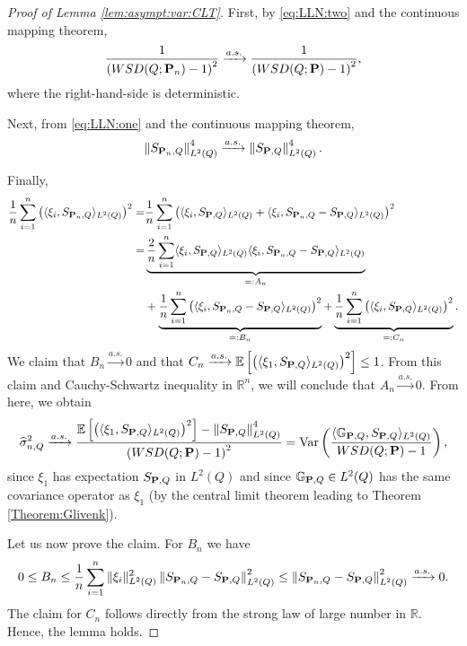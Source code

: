 \documentclass{imsart}
\numberwithin{equation}{section}
\def\R{\mathbb{R}}
\def\E{\mathbb{E}}
\def\E{\mathbb E}
\def\Var{\operatorname{Var}}
\begin{document}
\begin{proof}[Proof of Lemma \ref{lem:asympt:var:CLT}]
	First, by \eqref{eq:LLN:two} and the continuous mapping theorem,
	\[
	\frac{1}{
		\left(
		\rm WSD(Q; {\bf P}_n ) - 1
		\right)^2 
	}
	\xrightarrow{a.s.}
	\frac{1}{
		\left(
		\rm WSD(Q; {\bf P} ) - 1
		\right)^2},
	\]
	where the right-hand-side is deterministic.
	
	Next,  from \eqref{eq:LLN:one} and the continuous mapping theorem,
	\[
	\left\| 
	S_{{\bf P}_n,Q }
	\right\|_{L^2(Q)}^4
	\xrightarrow{a.s.}
	\left\| 
	S_{{\bf P},Q }
	\right\|_{L^2(Q)}^4.
	\]
	
	Finally,
	\begin{align*}
		\frac{1}{n}\sum_{i=1}^n
		\left( 
		\langle
		\xi_i
		,
		S_{{\bf P}_n,Q }
		\rangle_{L^2(Q)}
		\right)^2
		= &
		\frac{1}{n}\sum_{i=1}^n
		\left( 
		\langle
		\xi_i
		,
		S_{{\bf P},Q }
		\rangle_{L^2(Q)}
		+
		\langle
		\xi_i
		,
		S_{{\bf P}_n,Q }
		-
		S_{{\bf P},Q }
		\rangle_{L^2(Q)}
		\right)^2
		\\
		=  &
		\underbrace{\frac{2}{n}\sum_{i=1}^n 
			\langle
			\xi_i
			,
			S_{{\bf P},Q }
			\rangle_{L^2(Q)} \langle
			\xi_i
			,
			S_{{\bf P}_n,Q }-S_{{\bf P},Q }
			\rangle_{L^2(Q)}}_{=:A_n}\\
		& +\underbrace{\frac{1}{n}\sum_{i=1}^n
			\left( 
			\langle
			\xi_i
			,
			S_{{\bf P}_n,Q }
			-
			S_{{\bf P},Q }
			\rangle_{L^2(Q)}
			\right)^2}_{=:B_n}
		+\underbrace{\frac{1}{n}\sum_{i=1}^n
			\left( 
			\langle
			\xi_i
			,
			S_{{\bf P},Q }
			\rangle_{L^2(Q)}
			\right)^2}_{=:C_n}.
	\end{align*}
	We claim that $B_n \xrightarrow{a.s.} 0$ and that $C_n \xrightarrow{a.s.} \E
	\left[ 
	\left(
	\langle 
	\xi_1
	,
	S_{{\bf P},Q }
	\rangle_{L^2(Q)}
	\right)^2
	\right] \le 1$. From this claim and Cauchy-Schwartz inequality in $\R^n$, we will conclude that $A_n \xrightarrow{a.s.} 0$. From here, we obtain
	\[
	\widehat{\sigma}_{n,Q}^2
	\xrightarrow{a.s.}
	\frac{
		\E
		\left[ 
		\left(
		\langle 
		\xi_1
		,
		S_{{\bf P},Q }
		\rangle_{L^2(Q)}
		\right)^2
		\right]
		-
		\left\| 
		S_{{\bf P},Q }
		\right\|_{L^2(Q)}^4
	}{
		\left(
		\rm WSD(Q; {\bf P} ) - 1
		\right)^2
	}
	=
	\Var
	\left( 
	\frac{\langle \mathbb{G}_{{\bf P},Q}, S_{{\bf P},Q } \rangle_{L^2(Q)} }{ \rm WSD(Q; {\bf P} )-1}
	\right),
	\]
	since 
	$\xi_1$ has expectation $S_{{\bf P},Q }$ in $L^2(Q)$ and since
	$\mathbb{G}_{{\bf P},Q} \in L^2(Q)$ has the same covariance operator as $\xi_1$ (by the central limit theorem leading to Theorem \ref{Theorem:Glivenk}).
	
	Let us now prove the claim. For $B_n$ we have
	\[
	0 \le
	B_n 
	\le 
	\frac{1}{n}\sum_{i=1}^n
	\| 
	\xi_i
	\|_{L^2(Q)}^2
	\left\| 
	S_{{\bf P}_n,Q }
	-
	S_{{\bf P},Q }
	\right\|_{L^2(Q)}^2
	\le 
	\left\| 
	S_{{\bf P}_n,Q }
	-
	S_{{\bf P},Q }
	\right\|_{L^2(Q)}^2
	\xrightarrow{a.s.}0.
	\]
	The claim for $C_n$ follows directly from the strong law of large number in $\mathbb{R}$. 
	Hence, the lemma holds.
\end{proof}
\end{document}

